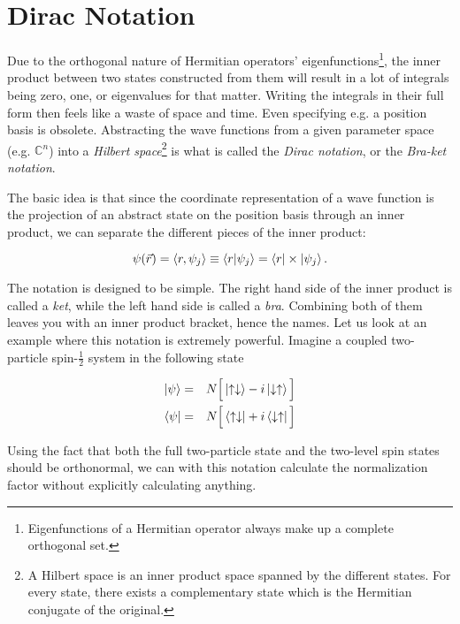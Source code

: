 \chapter{Dirac Notation}

Due to the orthogonal nature of Hermitian operators' eigenfunctions\footnote{Eigenfunctions of a Hermitian operator always make up a complete orthogonal set.}, the inner product between two states constructed from them will result in a lot of integrals being zero, one, or eigenvalues for that matter. Writing the integrals in their full form then feels like a waste of space and time. Even specifying e.g. a position basis is obsolete. Abstracting the wave functions from a given parameter space (e.g. $\mathbb{C}^n$) into a \textit{Hilbert space}\footnote{A Hilbert space is an inner product space spanned by the different states. For every state, there exists a complementary state which is the Hermitian conjugate of the original\cite{griffiths}.} is what is called the \textit{Dirac notation}, or the \textit{Bra-ket notation}.

The basic idea is that since the coordinate representation of a wave function is the projection of an abstract state on the position basis through an inner product, we can separate the different pieces of the inner product:

\begin{equation*}
 \psi(\vec r) = \langle r, \psi_j \rangle \equiv \left\langle r | \psi_j\right\rangle = \left< r \right|\times\left| \psi_j \right>. 
\end{equation*}


The notation is designed to be simple. The right hand side of the inner product is called a \textit{ket}, while the left hand side is called a \textit{bra}. Combining both of them leaves you with an inner product bracket, hence the names. Let us look at an example where this notation is extremely powerful. Imagine a coupled two-particle spin-$\frac{1}{2}$ system in the following state

\begin{eqnarray}
 \left| \psi \right> &=& N\Big[\left| \uparrow\downarrow \right> -i\left| \downarrow\uparrow \right>\Big]\\
 \left< \psi \right| &=& N\Big[\left< \uparrow\downarrow \right| +i\left< \downarrow\uparrow \right|\Big]
\end{eqnarray} 

Using the fact that both the full two-particle state and the two-level spin states should be orthonormal, we can with this notation calculate the normalization factor without explicitly calculating anything.

